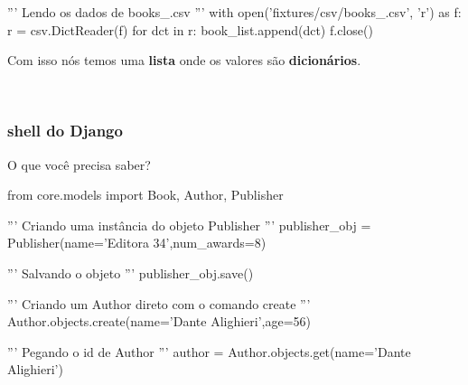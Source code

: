 \documentclass[aspectratio=169]{beamer}
\begin{document}
{\begin{frame}[fragile]
\begin{pythoncode}
''' Lendo os dados de books_.csv '''
with open('fixtures/csv/books_.csv', 'r') as f:
    r = csv.DictReader(f)
    for dct in r:
        book_list.append(dct)
    f.close()
\end{pythoncode}

\end{frame}

\begin{frame}[fragile]
	
Com isso nós temos uma \textbf{lista} onde os valores são \textbf{dicionários}.

\

\begin{bashcode}
\end{bashcode}

\end{frame}


\begin{frame}[fragile]\frametitle{shell do Django}
	

\end{frame}

\begin{frame}[fragile]

O que você precisa saber?

\begin{bashcode}
	from core.models import Book, Author, Publisher

	''' Criando uma instância do objeto Publisher '''
	publisher_obj = Publisher(name='Editora 34',num_awards=8)

	''' Salvando o objeto '''
	publisher_obj.save()

	''' Criando um Author direto com o comando create '''
	Author.objects.create(name='Dante Alighieri',age=56)

	''' Pegando o id de Author '''
	author = Author.objects.get(name='Dante Alighieri')


\end{bashcode}
\end{frame}}
\end{document}
